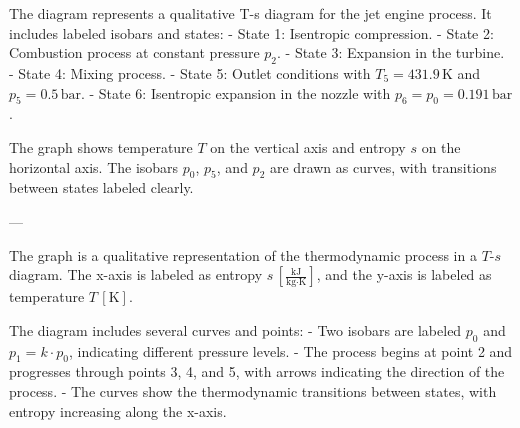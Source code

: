 The diagram represents a qualitative T-s diagram for the jet engine process. It includes labeled isobars and states:  
- State 1: Isentropic compression.  
- State 2: Combustion process at constant pressure \( p_2 \).  
- State 3: Expansion in the turbine.  
- State 4: Mixing process.  
- State 5: Outlet conditions with \( T_5 = 431.9 \, \text{K} \) and \( p_5 = 0.5 \, \text{bar} \).  
- State 6: Isentropic expansion in the nozzle with \( p_6 = p_0 = 0.191 \, \text{bar} \).  

The graph shows temperature \( T \) on the vertical axis and entropy \( s \) on the horizontal axis. The isobars \( p_0 \), \( p_5 \), and \( p_2 \) are drawn as curves, with transitions between states labeled clearly.  

---

The graph is a qualitative representation of the thermodynamic process in a \( T \)-\( s \) diagram. The x-axis is labeled as entropy \( s \, [\frac{\text{kJ}}{\text{kg·K}}] \), and the y-axis is labeled as temperature \( T \, [\text{K}] \).  

The diagram includes several curves and points:  
- Two isobars are labeled \( p_0 \) and \( p_1 = k \cdot p_0 \), indicating different pressure levels.  
- The process begins at point 2 and progresses through points 3, 4, and 5, with arrows indicating the direction of the process.  
- The curves show the thermodynamic transitions between states, with entropy increasing along the x-axis.